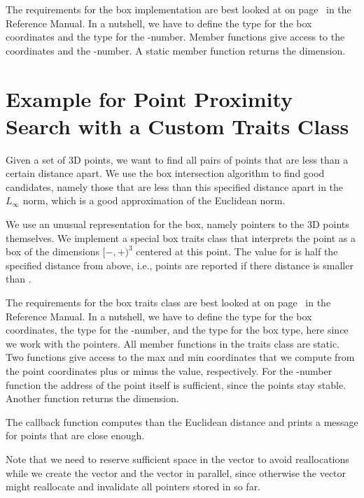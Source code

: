 The requirements for the box implementation are best looked at on
page~ in the Reference Manual. In a
nutshell, we have to define the type  for the box coordinates
and the type  for the -number. Member functions
give access to the coordinates and the -number. A static
member function returns the dimension.



\section{Example for Point Proximity Search with a Custom Traits Class}

Given a set of 3D points, we want to find all pairs of points that are
less than a certain distance apart. We use the box intersection
algorithm to find good candidates, namely those that are less than
this specified distance apart in the $L_\infty$ norm, which is a good
approximation of the Euclidean norm.

We use an unusual representation for the box, namely pointers to the 3D points
themselves. We implement a special box traits class that interprets
the point as a box of the dimensions $[-$$,+$$)^3$
centered at this point. The value for  is half the specified distance
from above, i.e., points are reported if there distance is smaller
than .

The requirements for the box traits class are best looked at on
page~ in the Reference Manual. In a
nutshell, we have to define the type  for the box coordinates,
the type  for the -number, and the type 
for the box type, here  since we work with the pointers.
All member functions in the traits class are static. Two functions give
access to the max and min coordinates that we compute from the point
coordinates plus or minus the  value, respectively. For the
-number function the address of the point itself is
sufficient, since the points stay stable. Another function
returns the dimension.

The callback function  computes than the Euclidean
distance and prints a message for points that are close enough.

Note that we need to reserve sufficient space in the 
vector to avoid reallocations while we create the  vector
and the  vector in parallel, since otherwise the
 vector might reallocate and invalidate all pointers
stored in  so far.


